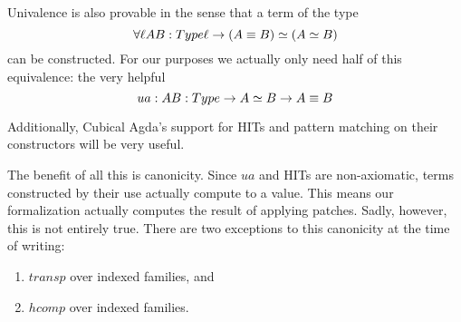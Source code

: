 Univalence is also provable in the sense that a term of the type
\[\forall{\ell}{A B : Type \ell} \rightarrow (A \equiv B) \simeq (A \simeq B)\]
can be constructed. For our purposes we actually only need half of this
equivalence: the very helpful
\[ua : {A B : Type} \rightarrow A \simeq B \rightarrow A \equiv B\]

Additionally, Cubical Agda's support for HITs and pattern matching on their
constructors will be very useful.

The benefit of all this is canonicity. Since $ua$ and HITs are non-axiomatic,
terms constructed by their use actually compute to a value. This means our
formalization actually computes the result of applying patches. Sadly, however,
this is not entirely true. There are two exceptions to this canonicity at the
time of writing:
\begin{enumerate}
\item $transp$ over indexed families, and
\item $hcomp$ over indexed families.
\end{enumerate}